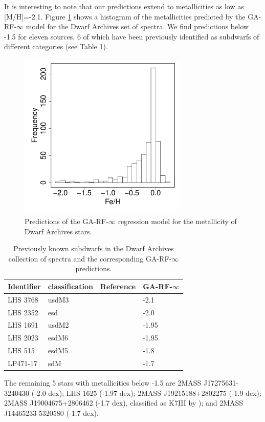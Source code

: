 It is interesting to note that our predictions extend to metallicities
as low as [M/H]=-2.1. Figure \ref{fig:ipac-hist-mets} shows a histogram of
the metallicities predicted by the GA-RF-$\infty$ model for the Dwarf Archives 
set of spectra. We find predictions below -1.5 for eleven sources, 6
of which have been previously identified as subdwarfs of different
categories (see Table \ref{tab:known-sds}).

\begin{figure}
	\begin{center}
		\includegraphics[width=8cm]{figs/ipac-figs/ipac-M-hist}

	\end{center}
        
        \caption{\label{fig:ipac-hist-mets}
Predictions of the GA-RF-$\infty$ regression model
        for the metallicity of Dwarf Archives stars.}

\end{figure}


\begin{table}\centering
	\begin{tabular}{@{}llll@{}}
		\hline
		Identifier & classification & Reference & GA-RF-$\infty$\\
		\hline
		LHS 3768 & usdM3 & \cite{1995AJ....109..797K}  & -2.1 \\
		LHS 2352 & esd   & \cite{1995AJ....109..797K}  & -2.0 \\
		LHS 1691 & usdM2 & \cite{0004-637X-669-2-1235} & -1.95\\
		LHS 2023 & esdM6 & \cite{0004-637X-672-2-1153} & -1.95\\
		LHS 515  & esdM5 & \cite{1538-3873-117-833-676}& -1.8\\
		LP471-17 & sdM   & \cite{1995AJ....109..797K}  & -1.7\\
		\hline
	\end{tabular}
        
	\caption{Previously known subdwarfs in the Dwarf Archives collection of
	spectra and the corresponding GA-RF-$\infty$ predictions.}

\label{tab:known-sds} 
\end{table}

The remaining 5 stars with metallicities below -1.5 are 2MASS
J17275631-3240430 (-2.0 dex); LHS 1625 (-1.97 dex); 2MASS
J19215188+2802275 (-1.9 dex); 2MASS J19004675+2806462 (-1.7 dex),
classified as K7III by \cite{1994ApJS...94..749K}); and 2MASS
J14465233-5320580 (-1.7 dex).

